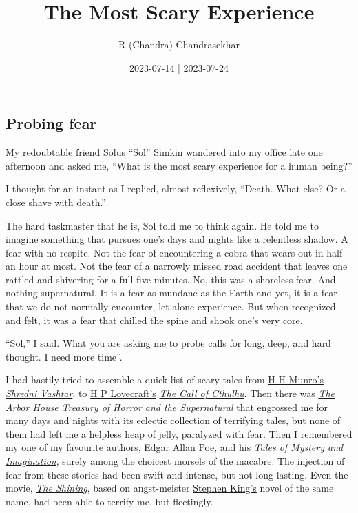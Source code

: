 \documentclass[
  a4paper,
]{article}
\title{The Most Scary Experience}
\author{R (Chandra) Chandrasekhar}
\date{2023-07-14 | 2023-07-24}
\begin{document}
\maketitle

\thispagestyle{empty}


\hypertarget{probing-fear}{%
\subsection{Probing fear}\label{probing-fear}}

My redoubtable friend Solus ``Sol'' Simkin wandered into my office late
one afternoon and asked me, ``What is the most scary experience for a
human being?''

I thought for an instant as I replied, almost reflexively, ``Death. What
else? Or a close shave with death.''

The hard taskmaster that he is, Sol told me to think again. He told me
to imagine something that pursues one's days and nights like a
relentless shadow. A fear with no respite. Not the fear of encountering
a cobra that wears out in half an hour at most. Not the fear of a
narrowly missed road accident that leaves one rattled and shivering for
a full five minutes. No, this was a shoreless fear. And nothing
supernatural. It is a fear as mundane as the Earth and yet, it is a fear
that we do not normally encounter, let alone experience. But when
recognized and felt, it was a fear that chilled the spine and shook
one's very core.

``Sol,'' I said. What you are asking me to probe calls for long, deep,
and hard thought. I need more time''.

I had hastily tried to assemble a quick list of scary tales from
\href{https://americanliterature.com/author/hh-munro-saki}{H H Munro's}
\href{https://www.classicshorts.com/stories/vashtar.html}{\emph{Shredni
Vashtar}}, to \href{https://www.hplovecraft.com/}{H P Lovecraft's}
\href{https://www.hplovecraft.com/writings/texts/fiction/cc.aspx}{\emph{The
Call of Cthulhu}}. Then there was
\href{https://openlibrary.org/books/OL4122966M/The_Arbor_House_treasury_of_horror_and_the_supernatural}{\emph{The
Arbor House Treasury of Horror and the Supernatural}} that engrossed me
for many days and nights with its eclectic collection of terrifying
tales, but none of them had left me a helpless heap of jelly, paralyzed
with fear. Then I remembered my one of my favourite authors,
\href{https://www.poetryfoundation.org/poets/edgar-allan-poe}{Edgar
Allan Poe}, and his
\href{https://www.amazon.in/Tales-Mystery-Imagination-Collins-Classics/dp/0007420226}{\emph{Tales
of Mystery and Imagination}}, surely among the choicest morsels of the
macabre. The injection of fear from these stories had been swift and
intense, but not long-lasting. Even the movie,
\href{https://www.imdb.com/title/tt0081505/}{\emph{The Shining}}, based
on angst-meister
\href{https://www.britannica.com/biography/Stephen-King}{Stephen King's}
novel of the same name, had been able to terrify me, but fleetingly.
\end{document}
